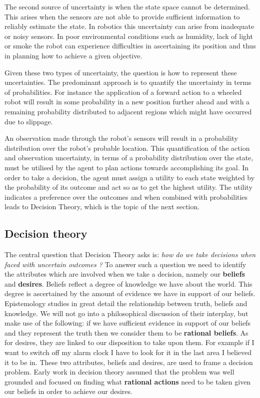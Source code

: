 The second source of uncertainty is when the state space cannot be determined. This arises when the sensors are not able to 
provide sufficient information to reliably estimate the state. In robotics this uncertainty can arise from inadequate or noisy sensors. 
In poor environmental conditions such as humidity, lack of light or smoke the robot can experience difficulties in 
ascertaining its position and thus in planning how to achieve a given objective.

Given these two types of uncertainty, the question is how to represent these uncertainties. The predominant approach 
is to quantify the uncertainty in terms of probabilities. For instance the application of a forward action to a wheeled robot 
will result in some probability in a new position further ahead and with a remaining probability distributed to adjacent 
regions which might have occurred due to slippage.

An observation made through the robot's sensors will result in a probability distribution over the robot's probable location.
This quantification of the action and observation uncertainty, in terms of a probability distribution over the state, must
be utilised by the agent to plan actions towards accomplishing its goal. In order to take a decision, the agent must assign a utility 
to each state weighted by the probability of its outcome and act so as to get the highest utility. The utility indicates a 
preference over the outcomes and when combined with probabilities leads to Decision Theory, which is the topic of the next section. 

\subsection{Decision theory}

The central question that Decision Theory asks is: \textit{how do we take decisions when faced with uncertain outcomes ?} To answer
such a question we need to identify the attributes which are involved when we take a decision, namely our \textbf{beliefs} and 
\textbf{desires}. Beliefs reflect a degree of knowledge we have about the world. This degree is ascertained by 
the amount of evidence we have in support of our beliefs. Epistemology studies in great detail the relationship between 
truth, beliefs and knowledge. We will not go into a philosophical discussion of their interplay, but make use of the following: 
if we have sufficient evidence in support of our beliefs and they represent the truth then we consider them to 
be \textbf{rational beliefs}. As for desires, they are linked to our disposition to take upon them. For 
example if I want to switch off my alarm clock I have to look for it in the last area I believed it to be in. 
These two attributes, beliefs and desires, are used to frame a decision problem. Early work in decision theory assumed 
that the problem was well grounded and focused on finding what \textbf{rational actions} need to be taken given our beliefs 
in order to achieve our desires. 


